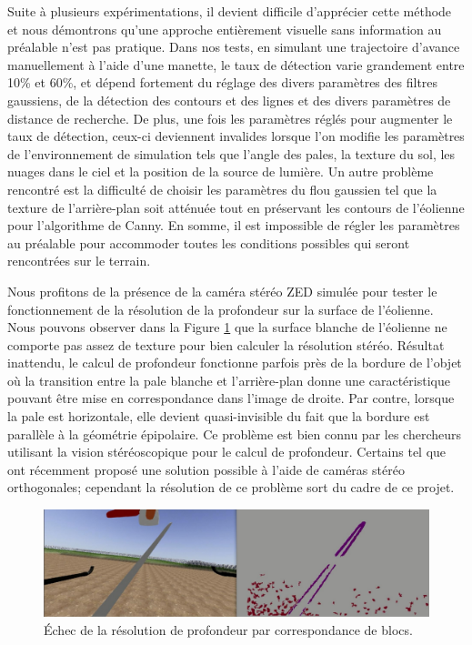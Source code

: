Suite à plusieurs expérimentations, il devient difficile d'apprécier cette méthode et nous démontrons qu'une approche entièrement visuelle sans information au préalable n'est pas pratique. Dans nos tests, en simulant une trajectoire d'avance manuellement à l'aide d'une manette, le taux de détection varie grandement entre 10\% et 60\%, et dépend fortement du réglage des divers paramètres des filtres gaussiens, de la détection des contours et des lignes et des divers paramètres de distance de recherche. De plus, une fois les paramètres réglés pour augmenter le taux de détection, ceux-ci deviennent invalides lorsque l'on modifie les paramètres de l'environnement de simulation tels que l'angle des pales, la texture du sol, les nuages dans le ciel et la position de la source de lumière. Un autre problème rencontré est la difficulté de choisir les paramètres du flou gaussien tel que la texture de l'arrière-plan soit atténuée tout en préservant les contours de l'éolienne pour l'algorithme de Canny. En somme, il est impossible de régler les paramètres au préalable pour accommoder toutes les conditions possibles qui seront rencontrées sur le terrain.

Nous profitons de la présence de la caméra stéréo ZED simulée pour tester le fonctionnement de la résolution de la profondeur sur la surface de l'éolienne. Nous pouvons observer dans la Figure \ref{fig:stereo_fail} que la surface blanche de l'éolienne ne comporte pas assez de texture pour bien calculer la résolution stéréo. Résultat inattendu, le calcul de profondeur fonctionne parfois près de la bordure de l'objet où la transition entre la pale blanche et l'arrière-plan donne une caractéristique pouvant être mise en correspondance dans l'image de droite. Par contre, lorsque la pale est horizontale, elle devient quasi-invisible du fait que la bordure est parallèle à la géométrie épipolaire. Ce problème est bien connu par les chercheurs utilisant la vision stéréoscopique pour le calcul de profondeur. Certains tel que \citep{meier2017real} ont récemment proposé une solution possible à l'aide de caméras stéréo orthogonales; cependant la résolution de ce problème sort du cadre de ce projet.

\begin{figure}[htb]
  \includegraphics[width=\linewidth]{images/stereo_failure.jpg}
  \caption{Échec de la résolution de profondeur par correspondance de blocs.}
  \label{fig:stereo_fail}
\end{figure}

